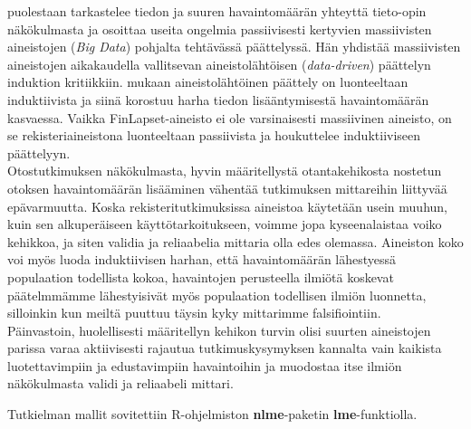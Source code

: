 \documentclass[finnish]{docopts}
\begin{document}
\cite{fricke14} puolestaan tarkastelee tiedon ja suuren havaintomäärän yhteyttä tieto-opin näkökulmasta ja osoittaa useita ongelmia passiivisesti kertyvien massiivisten aineistojen (\textit{Big Data}) pohjalta tehtävässä päättelyssä. Hän yhdistää massiivisten aineistojen aikakaudella vallitsevan aineistolähtöisen (\textit{data-driven}) päättelyn \cite{popper86} induktion kritiikkiin. \cite{fricke14} mukaan aineistolähtöinen päättely on luonteeltaan induktiivista ja siinä korostuu harha tiedon lisääntymisestä havaintomäärän kasvaessa. Vaikka FinLapset-aineisto ei ole varsinaisesti massiivinen aineisto, on se rekisteriaineistona luonteeltaan passiivista ja houkuttelee induktiiviseen päättelyyn.\\

Otostutkimuksen näkökulmasta, hyvin määritellystä otantakehikosta nostetun otoksen havaintomäärän lisääminen vähentää tutkimuksen mittareihin liittyvää epävarmuutta. Koska rekisteritutkimuksissa aineistoa käytetään usein muuhun, kuin sen alkuperäiseen käyttötarkoitukseen, voimme jopa kyseenalaistaa voiko kehikkoa, ja siten validia ja reliaabelia mittaria olla edes olemassa. Aineiston koko voi myös luoda induktiivisen harhan, että havaintomäärän lähestyessä populaation todellista kokoa, havaintojen perusteella ilmiötä koskevat päätelmmämme lähestyisivät myös populaation todellisen ilmiön luonnetta, silloinkin kun meiltä puuttuu täysin kyky mittarimme falsifiointiin.\\

Päinvastoin, huolellisesti määritellyn kehikon turvin olisi suurten aineistojen parissa varaa aktiivisesti rajautua tutkimuskysymyksen kannalta vain kaikista luotettavimpiin ja edustavimpiin havaintoihin ja muodostaa itse ilmiön näkökulmasta validi ja reliaabeli mittari.\\

\newpage

\nocite{*}
%
%
%




\lastpage

\appendices

\pagestyle{empty}

\label{appx:lme}

Tutkielman mallit sovitettiin R-ohjelmiston \cite{rsoftware} \textbf{nlme}-paketin \textbf{lme}-funktiolla. \\
\end{document}
